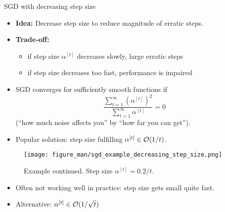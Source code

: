 \documentclass[11pt,compress,t,notes=noshow, xcolor=table]{beamer}
\begin{document}
\begin{vbframe}{SGD with decreasing step size}

\begin{itemize}
	\item \textbf{Idea:} Decrease step size to reduce magnitude of erratic steps.
	\item \textbf{Trade-off:}
	\begin{itemize}
		\item if step size $\alpha^{[t]}$ decreases slowly, large erratic steps%
		\item if step size decreases too fast, performance is impaired
	\end{itemize}
	\item SGD converges for sufficiently smooth functions if 
	$$
		\frac{\sum_{t = 1}^\infty \left(\alpha^{[t]}\right)^2}{\sum_{t = 1}^\infty \alpha^{[t]}} = 0
	$$
	(\enquote{how much noise affects you} by \enquote{how far you can get}).
\end{itemize}	

\framebreak 

\begin{itemize}
	\item Popular solution: step size fulfilling $\alpha^{[t]} \in \mathcal{O}(1/t)$. 
\end{itemize}

\begin{figure}
    \centering
    \texttt{[image: figure\_man/sgd\_example\_decreasing\_step\_size.png]}
    \caption*{Example continued.
        Step size $\alpha^{[t]} = 0.2/t$. }
\end{figure}

\vspace{-0.5\baselineskip}

\begin{itemize}
 	\item Often not working well in practice: step size gets small quite fast.
 	\item Alternative: $\alpha^{[t]} \in \mathcal{O}(1/\sqrt{t})$
\end{itemize}

\end{vbframe}
\end{document}
